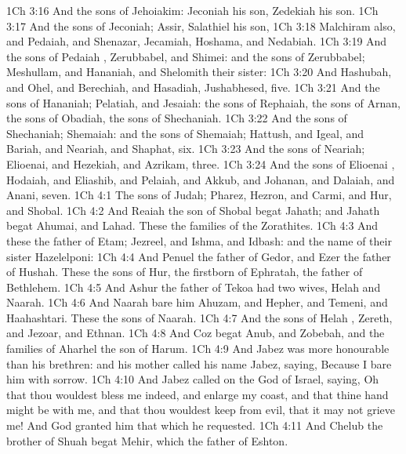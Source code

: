 \vs 1Ch 3:16 And the sons of Jehoiakim: Jeconiah his son, Zedekiah his son.
\vs 1Ch 3:17 And the sons of Jeconiah; Assir, Salathiel his son,
\vs 1Ch 3:18 Malchiram also, and Pedaiah, and Shenazar, Jecamiah, Hoshama, and Nedabiah.
\vs 1Ch 3:19 And the sons of Pedaiah , Zerubbabel, and Shimei: and the sons of Zerubbabel; Meshullam, and Hananiah, and Shelomith their sister:
\vs 1Ch 3:20 And Hashubah, and Ohel, and Berechiah, and Hasadiah, Jushabhesed, five.
\vs 1Ch 3:21 And the sons of Hananiah; Pelatiah, and Jesaiah: the sons of Rephaiah, the sons of Arnan, the sons of Obadiah, the sons of Shechaniah.
\vs 1Ch 3:22 And the sons of Shechaniah; Shemaiah: and the sons of Shemaiah; Hattush, and Igeal, and Bariah, and Neariah, and Shaphat, six.
\vs 1Ch 3:23 And the sons of Neariah; Elioenai, and Hezekiah, and Azrikam, three.
\vs 1Ch 3:24 And the sons of Elioenai , Hodaiah, and Eliashib, and Pelaiah, and Akkub, and Johanan, and Dalaiah, and Anani, seven.
\vs 1Ch 4:1 The sons of Judah; Pharez, Hezron, and Carmi, and Hur, and Shobal.
\vs 1Ch 4:2 And Reaiah the son of Shobal begat Jahath; and Jahath begat Ahumai, and Lahad. These  the families of the Zorathites.
\vs 1Ch 4:3 And these  the father of Etam; Jezreel, and Ishma, and Idbash: and the name of their sister  Hazelelponi:
\vs 1Ch 4:4 And Penuel the father of Gedor, and Ezer the father of Hushah. These  the sons of Hur, the firstborn of Ephratah, the father of Bethlehem.
\vs 1Ch 4:5 And Ashur the father of Tekoa had two wives, Helah and Naarah.
\vs 1Ch 4:6 And Naarah bare him Ahuzam, and Hepher, and Temeni, and Haahashtari. These  the sons of Naarah.
\vs 1Ch 4:7 And the sons of Helah , Zereth, and Jezoar, and Ethnan.
\vs 1Ch 4:8 And Coz begat Anub, and Zobebah, and the families of Aharhel the son of Harum.
\vs 1Ch 4:9 And Jabez was more honourable than his brethren: and his mother called his name Jabez, saying, Because I bare him with sorrow.
\vs 1Ch 4:10 And Jabez called on the God of Israel, saying, Oh that thou wouldest bless me indeed, and enlarge my coast, and that thine hand might be with me, and that thou wouldest keep  from evil, that it may not grieve me! And God granted him that which he requested.
\vs 1Ch 4:11 And Chelub the brother of Shuah begat Mehir, which  the father of Eshton.
